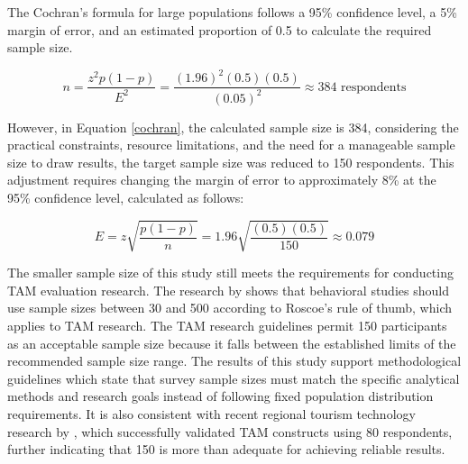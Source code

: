 The Cochran’s formula for large populations follows a 95\% confidence level, a 5\% margin of error, and an estimated proportion of 0.5 to calculate the required sample size. 

\begin{equation}
	\label{cochran}
	n = \frac{z^2 p(1-p)}{E^2} = \frac{(1.96)^2 (0.5)(0.5)}{(0.05)^2} \approx 384 \text{ respondents}
\end{equation}

However, in Equation \ref{cochran}, the calculated sample size is 384, considering the practical constraints, resource limitations, and the need for a manageable sample size to draw results, the target sample size was reduced to 150 respondents. This adjustment requires changing the margin of error to approximately 8\% at the 95\% confidence level, calculated as follows:

\begin{equation}
	E = z \sqrt{\frac{p(1-p)}{n}} = 1.96 \sqrt{\frac{(0.5)(0.5)}{150}} \approx 0.079
\end{equation}

The smaller sample size of this study still meets the requirements for conducting TAM evaluation research. The research by \textcite{Memon2020} shows that behavioral studies should use sample sizes between 30 and 500 according to Roscoe's rule of thumb, which applies to TAM research. The TAM research guidelines permit 150 participants as an acceptable sample size because it falls between the established limits of the recommended sample size range. The results of this study support methodological guidelines which state that survey sample sizes must match the specific analytical methods and research goals instead of following fixed population distribution requirements\parencite{Memon2020}. It is also consistent with recent regional tourism technology research by \textcite{Raynera2025}, which successfully validated TAM constructs using 80 respondents, further indicating that 150 is more than adequate for achieving reliable results.

